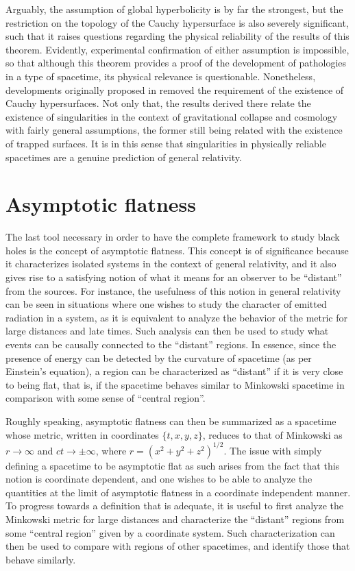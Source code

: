 \documentclass[
12pt,		%
openright,	%
twoside,  %
a4paper,			%
chapter=TITLE,		%
english,			%
french,				%
spanish,			%
brazil				%
]{USPSC-classe/USPSC}
\begin{document}
Arguably, the assumption of global hyperbolicity is by far the strongest, but the restriction on the topology of the Cauchy hypersurface is also severely significant, such that it raises questions regarding the physical reliability of the results of this theorem. Evidently, experimental confirmation of either assumption is impossible, so that although this theorem provides a proof of the development of pathologies in a type of spacetime, its physical relevance is questionable. Nonetheless, developments originally proposed in \cite{Hawking1970} removed the requirement of the existence of Cauchy hypersurfaces. Not only that, the results derived there relate the existence of singularities in the context of gravitational collapse and cosmology with fairly general assumptions, the former still being related with the existence of trapped surfaces. It is in this sense that singularities in physically reliable spacetimes are a genuine prediction of general relativity.

\section{Asymptotic flatness}\label{flat}

The last tool necessary in order to have the complete framework to study black holes is the concept of asymptotic flatness. This concept is of significance because it characterizes isolated systems in the context of general relativity, and it also gives rise to a satisfying notion of what it means for an observer to be “distant” from the sources. For instance, the usefulness of this notion in general relativity can be seen in situations where one wishes to study the character of emitted radiation in a system, as it is equivalent to analyze the behavior of the metric for large distances and late times. Such analysis can then be used to study what events can be causally connected to the “distant” regions. In essence, since the presence of energy can be detected by the curvature of spacetime (as per Einstein's equation), a region can be characterized as “distant” if it is very close to being flat, that is, if the spacetime behaves similar to Minkowski spacetime in comparison with some sense of ``central region''.

Roughly speaking, asymptotic flatness can then be summarized as a spacetime whose metric, written in coordinates $\{t,x,y,z\}$, reduces to that of Minkowski as $r\to\infty$ and $ct\to\pm\infty$, where $r=\left(x^2+y^2+z^2\right)^{1/2}$. The issue with simply defining a spacetime to be asymptotic flat as such arises from the fact that this notion is coordinate dependent, and one wishes to be able to analyze the quantities at the limit of asymptotic flatness in a coordinate independent manner. To progress towards a definition that is adequate, it is useful to first analyze the Minkowski metric for large distances and characterize the ``distant'' regions from some ``central region'' given by a coordinate system. Such characterization can then be used to compare with regions of other spacetimes, and identify those that behave similarly. 
\end{document}
